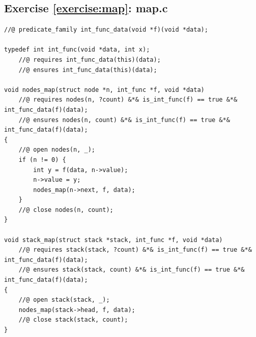 \documentclass{article}
\begin{document}
\subsection{Exercise \ref{exercise:map}:
map.c}\label{solution:map}

\begin{lstlisting}
//@ predicate_family int_func_data(void *f)(void *data);

typedef int int_func(void *data, int x);
    //@ requires int_func_data(this)(data);
    //@ ensures int_func_data(this)(data);

void nodes_map(struct node *n, int_func *f, void *data)
    //@ requires nodes(n, ?count) &*& is_int_func(f) == true &*& int_func_data(f)(data);
    //@ ensures nodes(n, count) &*& is_int_func(f) == true &*& int_func_data(f)(data);
{
    //@ open nodes(n, _);
    if (n != 0) {
        int y = f(data, n->value);
        n->value = y;
        nodes_map(n->next, f, data);
    }
    //@ close nodes(n, count);
}

void stack_map(struct stack *stack, int_func *f, void *data)
    //@ requires stack(stack, ?count) &*& is_int_func(f) == true &*& int_func_data(f)(data);
    //@ ensures stack(stack, count) &*& is_int_func(f) == true &*& int_func_data(f)(data);
{
    //@ open stack(stack, _);
    nodes_map(stack->head, f, data);
    //@ close stack(stack, count);
}
\end{lstlisting}
\end{document}
